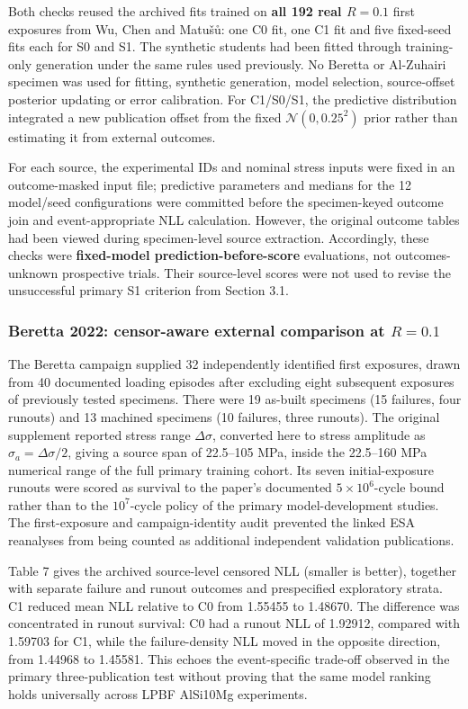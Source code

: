 \documentclass[12pt,a4paper]{article}
\begin{document}
Both checks reused the archived fits trained on \textbf{all 192 real \(R=0.1\)} first exposures from Wu, Chen and Matušů: one C0 fit, one C1 fit and five fixed-seed fits each for S0 and S1. The synthetic students had been fitted through training-only generation under the same rules used previously. No Beretta or Al-Zuhairi specimen was used for fitting, synthetic generation, model selection, source-offset posterior updating or error calibration. For C1/S0/S1, the predictive distribution integrated a new publication offset from the fixed \(\mathcal N(0,0.25^2)\) prior rather than estimating it from external outcomes.

For each source, the experimental IDs and nominal stress inputs were fixed in an outcome-masked input file; predictive parameters and medians for the 12 model/seed configurations were committed before the specimen-keyed outcome join and event-appropriate NLL calculation. However, the original outcome tables had been viewed during specimen-level source extraction. Accordingly, these checks were \textbf{fixed-model prediction-before-score} evaluations, not outcomes-unknown prospective trials. Their source-level scores were not used to revise the unsuccessful primary S1 criterion from Section 3.1.

\subsubsection{Beretta 2022: censor-aware external comparison at \(R=0.1\)}

The Beretta campaign supplied 32 independently identified first exposures, drawn from 40 documented loading episodes after excluding eight subsequent exposures of previously tested specimens. There were 19 as-built specimens (15 failures, four runouts) and 13 machined specimens (10 failures, three runouts). The original supplement reported stress range \(\Delta\sigma\), converted here to stress amplitude as \(\sigma_a=\Delta\sigma/2\), giving a source span of 22.5–105 MPa, inside the 22.5–160 MPa numerical range of the full primary training cohort. Its seven initial-exposure runouts were scored as survival to the paper's documented \(5\times10^6\)-cycle bound rather than to the \(10^7\)-cycle policy of the primary model-development studies. The first-exposure and campaign-identity audit prevented the linked ESA reanalyses from being counted as additional independent validation publications.

Table 7 gives the archived source-level censored NLL (smaller is better), together with separate failure and runout outcomes and prespecified exploratory strata. C1 reduced mean NLL relative to C0 from 1.55455 to 1.48670. The difference was concentrated in runout survival: C0 had a runout NLL of 1.92912, compared with 1.59703 for C1, while the failure-density NLL moved in the opposite direction, from 1.44968 to 1.45581. This echoes the event-specific trade-off observed in the primary three-publication test without proving that the same model ranking holds universally across LPBF AlSi10Mg experiments.
\end{document}
